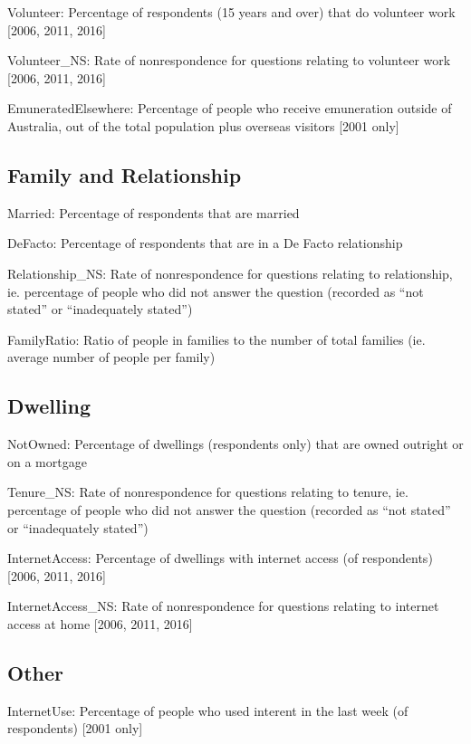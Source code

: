 \documentclass{monashthesis}
\theoremstyle{definition}
\theoremstyle{definition}
\theoremstyle{definition}
\theoremstyle{remark}
\begin{document}
Volunteer: Percentage of respondents (15 years and over) that do
volunteer work {[}2006, 2011, 2016{]}

Volunteer\_NS: Rate of nonrespondence for questions relating to
volunteer work {[}2006, 2011, 2016{]}

EmuneratedElsewhere: Percentage of people who receive emuneration
outside of Australia, out of the total population plus overseas visitors
{[}2001 only{]}

\subsection{Family and Relationship}\label{family-and-relationship}

Married: Percentage of respondents that are married

DeFacto: Percentage of respondents that are in a De Facto relationship

Relationship\_NS: Rate of nonrespondence for questions relating to
relationship, ie. percentage of people who did not answer the question
(recorded as ``not stated'' or ``inadequately stated'')

FamilyRatio: Ratio of people in families to the number of total families
(ie. average number of people per family)

\subsection{Dwelling}\label{dwelling}

NotOwned: Percentage of dwellings (respondents only) that are owned
outright or on a mortgage

Tenure\_NS: Rate of nonrespondence for questions relating to tenure, ie.
percentage of people who did not answer the question (recorded as ``not
stated'' or ``inadequately stated'')

InternetAccess: Percentage of dwellings with internet access (of
respondents) {[}2006, 2011, 2016{]}

InternetAccess\_NS: Rate of nonrespondence for questions relating to
internet access at home {[}2006, 2011, 2016{]}

\subsection{Other}\label{other}

InternetUse: Percentage of people who used interent in the last week (of
respondents) {[}2001 only{]}
\end{document}
